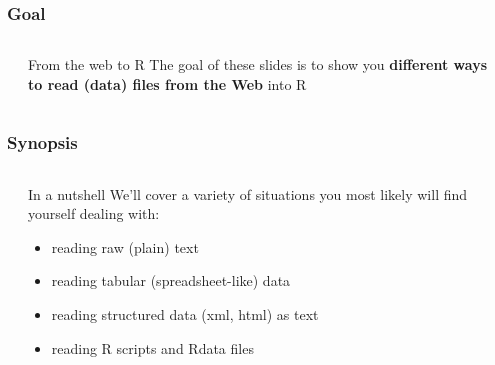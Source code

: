 \documentclass{beamer}\usepackage[]{graphicx}\usepackage[]{color}
\begin{document}

\begin{frame}
\frametitle{Goal}

\begin{columns}[t]
\begin{column}{0.1\textwidth}
\end{column}
\begin{column}{0.8\textwidth}

\begin{block}{From the web to R}
The goal of these slides is to show you \textbf{different ways to read (data) files from the Web} into R
\end{block}

\end{column}
\begin{column}{0.1\textwidth}
\end{column}
\end{columns}

\end{frame}


\begin{frame}
\frametitle{Synopsis}

\begin{columns}[t]
\begin{column}{0.1\textwidth}
\end{column}
\begin{column}{0.8\textwidth}

\begin{block}{In a nutshell}
We'll cover a variety of situations you most likely will find yourself dealing with:
\begin{itemize}
 \item reading raw (plain) text
 \item reading tabular (spreadsheet-like) data
 \item reading structured data (xml, html) as text
 \item reading R scripts and Rdata files
\end{itemize}
\end{block}

\end{column}
\begin{column}{0.1\textwidth}
\end{column}
\end{columns}

\end{frame}
\end{document}
